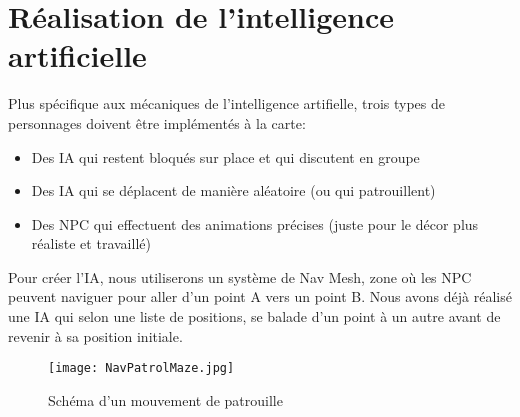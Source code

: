 \documentclass[../doc.tex]{subfiles}
\begin{document}
\section{Réalisation de l'intelligence artificielle}
Plus spécifique aux mécaniques de l'intelligence artifielle,
 trois types de personnages doivent être implémentés à la carte:
\begin{itemize}
    \item Des IA qui restent bloqués sur place et qui discutent en groupe
    \item Des IA qui se déplacent de manière aléatoire (ou qui patrouillent)
    \item Des NPC qui effectuent des animations précises
        (juste pour le décor plus réaliste et travaillé)
\end{itemize}

Pour créer l'IA, nous utiliserons un système de Nav Mesh, zone où les NPC peuvent naviguer pour aller d'un point A vers un point B.
Nous avons déjà réalisé une IA qui selon une liste de positions, se balade d'un point à un autre avant de revenir à sa position initiale.

\begin{figure}[h]
    \centering
    \texttt{[image: NavPatrolMaze.jpg]}
    \caption{Schéma d'un mouvement de patrouille}
\end{figure}
\end{document}
